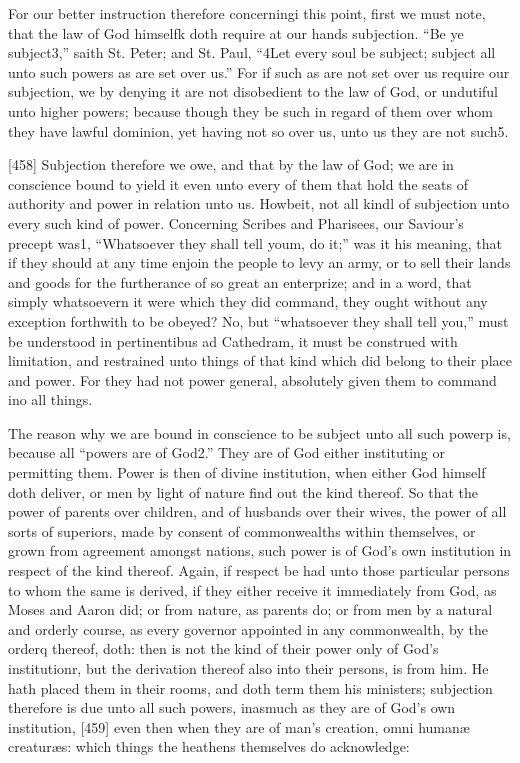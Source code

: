 For our better instruction therefore concerningi this point, first we must note, that the law of God himselfk doth require at our hands subjection. “Be ye subject3,” saith St. Peter; and St. Paul, “4Let every soul be subject; subject all unto such powers as are set over us.” For if such as are not set over us require our subjection, we by denying it are not disobedient to the law of God, or undutiful unto higher powers; because though they be such in regard of them over whom they have lawful dominion, yet having not so over us, unto us they are not such5.

[458]
Subjection therefore we owe, and that by the law of God; we are in conscience bound to yield it even unto every of them that hold the seats of authority and power in relation unto us. Howbeit, not all kindl of subjection unto every such kind of power. Concerning Scribes and Pharisees, our Saviour’s precept was1, “Whatsoever they shall tell youm, do it;” was it his meaning, that if they should at any time enjoin the people to levy an army, or to sell their lands and goods for the furtherance of so great an enterprize; and in a word, that simply whatsoevern it were which they did command, they ought without any exception forthwith to be obeyed? No, but “whatsoever they shall tell you,” must be understood in pertinentibus ad Cathedram, it must be construed with limitation, and restrained unto things of that kind which did belong to their place and power. For they had not power general, absolutely given them to command ino all things.

The reason why we are bound in conscience to be subject unto all such powerp is, because all “powers are of God2.” They are of God either instituting or permitting them. Power is then of divine institution, when either God himself doth deliver, or men by light of nature find out the kind thereof. So that the power of parents over children, and of husbands over their wives, the power of all sorts of superiors, made by consent of commonwealths within themselves, or grown from agreement amongst nations, such power is of God’s own institution in respect of the kind thereof. Again, if respect be had unto those particular persons to whom the same is derived, if they either receive it immediately from God, as Moses and Aaron did; or from nature, as parents do; or from men by a natural and orderly course, as every governor appointed in any commonwealth, by the orderq thereof, doth: then is not the kind of their power only of God’s institutionr, but the derivation thereof also into their persons, is from him. He hath placed them in their rooms, and doth term them his ministers; subjection therefore is due unto all such powers, inasmuch as they are of God’s own institution, [459] even then when they are of man’s creation, omni humanæ creaturæs: which things the heathens themselves do acknowledge:

